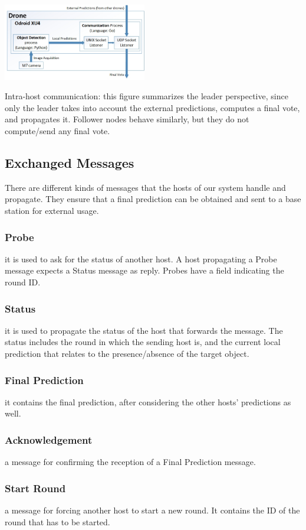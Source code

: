 \documentclass[10pt,conference,compsocconf]{IEEEtran}
\begin{document}
\begin{enumerate}
\begin{center}
	\captionsetup{type=figure}
	\includegraphics[width=0.47\textwidth]{img/protocol_sketch_intra_host.jpg}
	\caption {Intra-host communication: this figure summarizes the leader perspective, since only the leader takes into account the external predictions, computes a final vote, and propagates it. Follower nodes behave similarly, but they do not compute/send any final vote.}
	\label{fig:intra_host}
\end{center}
\subsection{Exchanged Messages}
There are different kinds of messages that the hosts of our system handle and propagate. They ensure that a final prediction can be obtained and sent to a base station for external usage.
\subsubsection{Probe} it is used to ask for the status of another host. A host propagating a Probe message expects a Status message as reply. Probes have a field indicating the round ID.
\subsubsection{Status} it is used to propagate the status of the host that forwards the message. The status includes the round in which the sending host is, and the current local prediction that relates to the presence/absence of the target object.
\subsubsection{Final Prediction} it contains the final prediction, after considering the other hosts' predictions as well.
\subsubsection{Acknowledgement} a message for confirming the reception of a Final Prediction message.
\subsubsection{Start Round} a message for forcing another host to start a new round. It contains the ID of the round that has to be started.

\end{enumerate}
\end{document}
